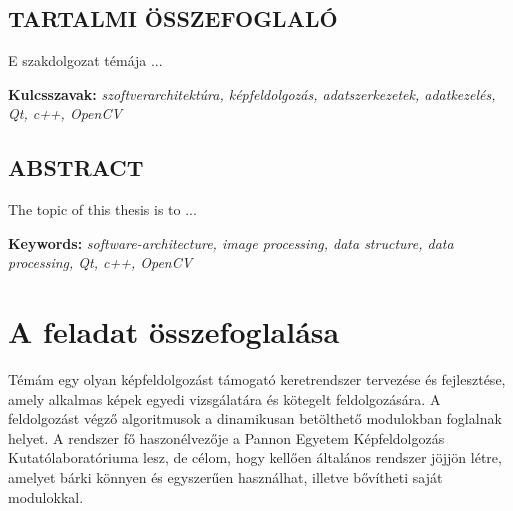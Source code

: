 \documentclass[a4paper,12pt,oneside]{report}
\begin{document}
\begin{center}
\section*{\textbf{\Large \MakeUppercase{Tartalmi összefoglaló}}}
\end{center}

E szakdolgozat témája ...

\vspace{2cm}

{\bf Kulcsszavak:} {\it szoftverarchitektúra, képfeldolgozás, adatszerkezetek, adatkezelés, Qt, c++, OpenCV}
\newpage

\newpage

\begin{center}
\section*{\textbf{\Large \MakeUppercase{Abstract}}}
\end{center}

The topic of this thesis is to ...

\vspace{2cm}

{\bf Keywords:} {\it software-architecture, image processing, data structure, data processing, Qt, c++, OpenCV}
\newpage
\listoftodos

\renewcommand{\thefigure}{\arabic{figure}}


\setcounter{tocdepth}{3} %
\thispagestyle{empty}
\tableofcontents
\pagebreak

\setcounter{page}{1} %
\pagestyle{plain}
\fancyhead[C]{\rightmark}
\fancyfoot[R]{\thepage}

\section{A feladat összefoglalása}

Témám egy olyan képfeldolgozást támogató keretrendszer tervezése és fejlesztése, amely alkalmas képek egyedi vizsgálatára és kötegelt feldolgozására. A feldolgozást végző algoritmusok a dinamikusan betölthető modulokban foglalnak helyet. A rendszer fő haszonélvezője a Pannon Egyetem Képfeldolgozás Kutatólaboratóriuma lesz, de célom, hogy kellően általános rendszer jöjjön létre, amelyet bárki könnyen és egyszerűen használhat, illetve bővítheti saját modulokkal.
\end{document}
